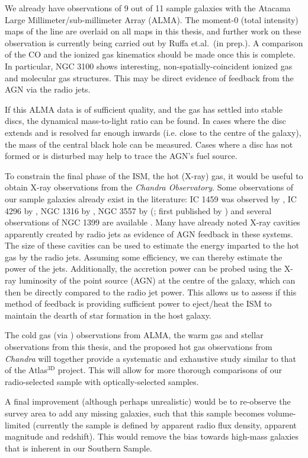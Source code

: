 	We already have observations of 9 out of 11 sample galaxies with the Atacama Large Millimeter/sub-millimeter Array (ALMA). The moment-0 (total intensity) maps of the  line are overlaid on all maps in this thesis, and further work on these observation is currently being carried out by Ruffa et.al.\ (in prep.). A comparison of the CO and the ionized gas kinematics should be made once this is complete. In particular, NGC 3100 shows interesting, non-spatially-coincident ionized gas and molecular gas structures. This may be direct evidence of feedback from the AGN via the radio jets. 

	If this ALMA data is of sufficient quality, and the gas has settled into stable discs, the dynamical mass-to-light ratio can be found. In cases where the disc extends and is resolved far enough inwards (i.e. close to the centre of the galaxy), the mass of the central black hole can be measured. Cases where a disc has not formed or is disturbed may help to trace the AGN's fuel source.

	To constrain the final phase of the ISM, the hot (X-ray) gas, it would be useful to obtain X-ray observations from the \textit{Chandra Observatory}. Some observations of our sample galaxies already exist in the literature: IC 1459 was observed by \citet{Fabbiano2003}, IC 4296 by \citet{Pellegrini2002}, NGC 1316 by \citet{Lanz2010}, NGC 3557 by \citeauthor{Ponman2001} (\citeyear{Ponman2001}; first published by \citealt{Balmaverde2005}) and several observations of NGC 1399 are available \citep[e.g.][]{Su2017}. Many have already noted X-ray cavities apparently created by radio jets as evidence of AGN feedback in these systems. The size of these cavities can be used to estimate the energy imparted to the hot gas by the radio jets. Assuming some efficiency, we can thereby estimate the power of the jets. Additionally, the accretion power can be probed using the X-ray luminosity of the point source (AGN) at the centre of the galaxy, which can then be directly compared to the radio jet power. This allows us to assess if this method of feedback is providing sufficient power to eject/heat the ISM to maintain the dearth of star formation in the host galaxy.

	The cold gas (via ) observations from ALMA, the warm gas and stellar observations from this thesis, and the proposed hot gas observations from \textit{Chandra} will together provide a systematic and exhaustive study similar to that of the Atlas$^\text{3D}$ project. This will allow for more thorough comparisons of our radio-selected sample with optically-selected samples.

	A final improvement (although perhaps unrealistic) would be to re-observe the survey area to add any missing galaxies, such that this sample becomes volume-limited (currently the sample is defined by apparent radio flux density, apparent magnitude and redshift). This would remove the bias towards high-mass galaxies that is inherent in our Southern Sample.

